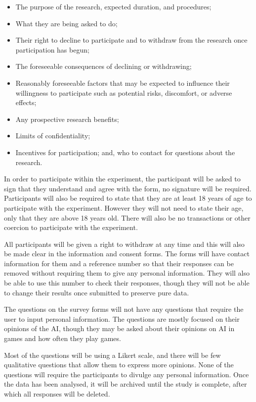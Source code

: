 \documentclass{IEEEtran}
\begin{document}

\begin{itemize}
	\item The purpose of the research, expected duration, and procedures;
	\item What they are being asked to do;
	\item Their right to decline to participate and to withdraw from the research once participation has begun;
	\item The foreseeable consequences of declining or withdrawing;
	\item Reasonably foreseeable factors that may be expected to influence their willingness to participate such as potential risks, discomfort, or adverse effects;
	\item Any prospective research benefits;
	\item Limits of confidentiality;
	\item Incentives for participation; and,
who to contact for questions about the research. 
\end{itemize}

In order to participate within the experiment, the participant will be asked to sign that they understand and agree with the form, no signature will be required. Participants will also be required to state that they are at least 18 years of age to participate with the experiment. However they will not need to state their age, only that they are above 18 years old. There will also be no transactions or other coercion to participate with the experiment.

All participants will be given a right to withdraw at any time and this will also be made clear in the information and consent forms. The forms will have contact information for them and a reference number so that their responses can be removed without requiring them to give any personal information. They will also be able to use this number to check their responses, though they will not be able to change their results once submitted to preserve pure data.

The questions on the survey forms will not have any questions that require the user to input personal information. The questions are mostly focused on their opinions of the AI, though they may be asked about their opinions on AI in games and how often they play games.

Most of the questions will be using a Likert scale, and there will be few qualitative questions that allow them to express more opinions. None of the questions will require the participants to divulge any personal information. Once the data has been analysed, it will be archived until the study is complete, after which all responses will be deleted.
\end{document}

